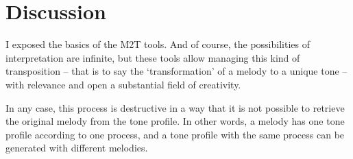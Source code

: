 \section{Discussion}

I exposed the basics of the M2T tools. And of course, the possibilities of interpretation are infinite, but these tools allow managing this kind of transposition -- that is to say the `transformation' of a melody to a unique tone -- with relevance and open a substantial field of creativity.

In any case, this process is destructive in a way that it is not possible to retrieve the original melody from the tone profile. In other words, a melody has one tone profile according to one process, and a tone profile with the same process can be generated with different melodies.